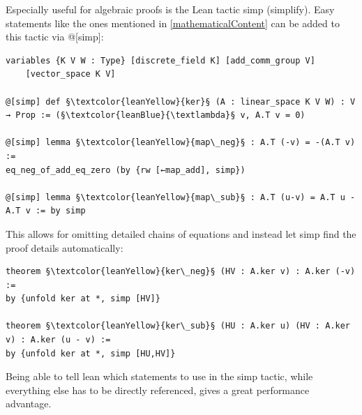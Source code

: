 \documentclass[11pt]{article}
\begin{document}
Especially useful for algebraic proofs is the Lean tactic {\lean simp} (simplify). Easy statements like the ones mentioned in \ref{mathematicalContent} can be added to this tactic via {\lean @[simp]}:
\begin{lstlisting}
variables {K V W : Type} [discrete_field K] [add_comm_group V]
	[vector_space K V]

@[simp] def §\textcolor{leanYellow}{ker}§ (A : linear_space K V W) : V → Prop := (§\textcolor{leanBlue}{\textlambda}§ v, A.T v = 0)

@[simp] lemma §\textcolor{leanYellow}{map\_neg}§ : A.T (-v) = -(A.T v) :=
eq_neg_of_add_eq_zero (by {rw [←map_add], simp})

@[simp] lemma §\textcolor{leanYellow}{map\_sub}§ : A.T (u-v) = A.T u - A.T v := by simp
\end{lstlisting}
This allows for omitting detailed chains of equations and instead let {\lean simp} find the proof details automatically:
\begin{lstlisting}
theorem §\textcolor{leanYellow}{ker\_neg}§ (HV : A.ker v) : A.ker (-v) :=
by {unfold ker at *, simp [HV]}

theorem §\textcolor{leanYellow}{ker\_sub}§ (HU : A.ker u) (HV : A.ker v) : A.ker (u - v) :=
by {unfold ker at *, simp [HU,HV]}
\end{lstlisting}
Being able to tell lean which statements to use in the {\lean simp} tactic, while everything else has to be directly referenced, gives a great performance advantage.
\end{document}
